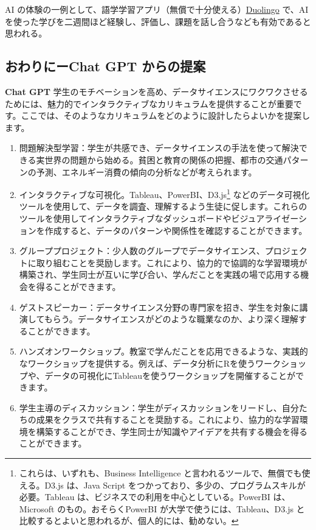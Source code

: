 \documentclass[
]{bxjsbook}
\theoremstyle{definition}
\theoremstyle{definition}
\theoremstyle{definition}
\theoremstyle{definition}
\theoremstyle{remark}
\begin{document}
AI の体験の一例として、語学学習アプリ（無償で十分使える）\href{https://www.duolingo.com/}{Duolingo} で、AI を使った学びを二週間ほど経験し、評価し、課題を話し合うなども有効であると思われる。

\hypertarget{ux304aux308fux308aux306bux30fcchat-gpt-ux304bux3089ux306eux63d0ux6848}{%
\subsection{おわりにーChat GPT からの提案}\label{ux304aux308fux308aux306bux30fcchat-gpt-ux304bux3089ux306eux63d0ux6848}}

\textbf{Chat GPT} 学生のモチベーションを高め、データサイエンスにワクワクさせるためには、魅力的でインタラクティブなカリキュラムを提供することが重要です。ここでは、そのようなカリキュラムをどのように設計したらよいかを提案します。

\begin{enumerate}
\def\labelenumi{\arabic{enumi}.}
\item
  問題解決型学習：学生が共感でき、データサイエンスの手法を使って解決できる実世界の問題から始める。貧困と教育の関係の把握、都市の交通パターンの予測、エネルギー消費の傾向の分析などが考えられます。
\item
  インタラクティブな可視化。Tableau、PowerBI、D3.js\footnote{これらは、いずれも、Business Intelligence と言われるツールで、無償でも使える。D3.js は、Java Script をつかっており、多少の、プログラムスキルが必要。Tableau は、ビジネスでの利用を中心としている。PowerBI は、Microsoft のもの。おそらくPowerBI が大学で使うには、Tableau、D3.js と比較するとよいと思われるが、個人的には、勧めない。} などのデータ可視化ツールを使用して、データを調査、理解するよう生徒に促します。これらのツールを使用してインタラクティブなダッシュボードやビジュアライゼーションを作成すると、データのパターンや関係性を確認することができます。
\item
  グループプロジェクト：少人数のグループでデータサイエンス、プロジェクトに取り組むことを奨励します。これにより、協力的で協調的な学習環境が構築され、学生同士が互いに学び合い、学んだことを実践の場で応用する機会を得ることができます。
\item
  ゲストスピーカー：データサイエンス分野の専門家を招き、学生を対象に講演してもらう。データサイエンスがどのような職業なのか、より深く理解することができます。
\item
  ハンズオンワークショップ。教室で学んだことを応用できるような、実践的なワークショップを提供する。例えば、データ分析にRを使うワークショップや、データの可視化にTableauを使うワークショップを開催することができます。
\item
  学生主導のディスカッション：学生がディスカッションをリードし、自分たちの成果をクラスで共有することを奨励する。これにより、協力的な学習環境を構築することができ、学生同士が知識やアイデアを共有する機会を得ることができます。
\end{enumerate}
\end{document}
